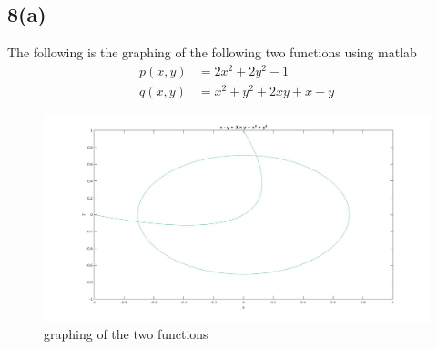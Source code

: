 \documentclass{article}
\begin{document}
\subsection{8(a)}
The following is the graphing of the following two functions using matlab
\begin{equation*}
\begin{aligned}
p(x,y) &= 2x^2 +2y^2 -1\\
q(x,y) &= x^2 + y^2 + 2xy + x - y
\end{aligned}
\end{equation*}
\begin{figure}[H]
\centering
\includegraphics[width=5in]{p8-1.jpg}
\caption{graphing of the two functions}
\end{figure}
\end{document}

